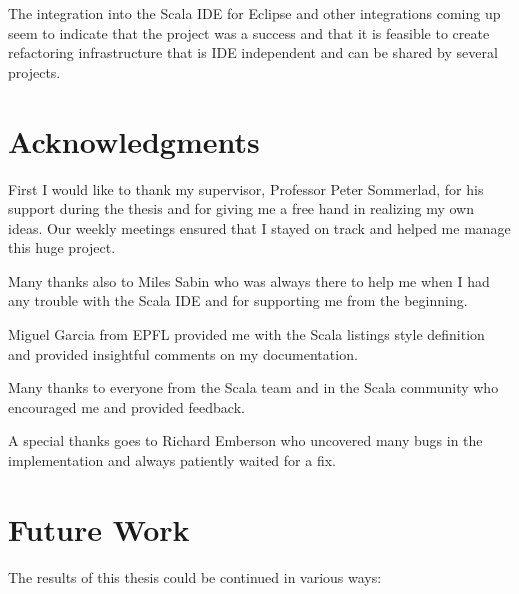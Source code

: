 \documentclass[10pt,a4paper,oneside]{scrreprt}
\begin{document}
The integration into the Scala IDE for Eclipse and other integrations coming up seem to indicate that the project was a success and that it is feasible to create refactoring infrastructure that is IDE independent and can be shared by several projects.

\section{Acknowledgments}

First I would like to thank my supervisor, Professor Peter Sommerlad, for his support during the thesis and for giving me a free hand in realizing my own ideas. Our weekly meetings ensured that I stayed on track and helped me manage this huge project.

Many thanks also to Miles Sabin who was always there to help me when I had any trouble with the Scala IDE and for supporting me from the beginning. 

Miguel Garcia from EPFL provided me with the Scala listings style definition and provided insightful comments on my documentation.

Many thanks to everyone from the Scala team and in the Scala community who encouraged me and provided feedback. 

A special thanks goes to Richard Emberson who uncovered many bugs in the implementation and always patiently waited for a fix.


\section{Future Work}

The results of this thesis could be continued in various ways:
\end{document}
